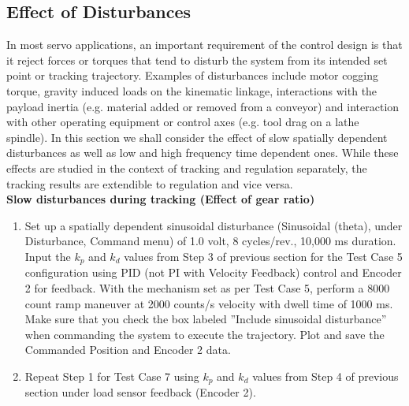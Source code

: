 \documentclass[11pt, a4paper]{article}
\begin{document}
\subsection{Effect of Disturbances}
In most servo applications, an important requirement of the control design is that it reject forces or torques that tend to disturb the system from its intended set point or tracking trajectory. Examples of disturbances include motor cogging torque, gravity induced loads on the kinematic linkage, interactions with the payload inertia (e.g. material added or removed from a conveyor) and interaction with other operating equipment or control axes (e.g. tool drag on a lathe spindle). In this section we shall consider the effect of slow spatially dependent disturbances as well as low and high frequency time dependent ones. While these effects are studied in the context of tracking and regulation separately, the tracking results are extendible to regulation and vice versa.\\
\textbf{Slow disturbances during tracking (Effect of gear ratio)}
\begin{enumerate}
\item Set up a spatially dependent sinusoidal disturbance (Sinusoidal (theta), under Disturbance, Command menu) of 1.0 volt, 8 cycles/rev., 10,000 ms duration. Input the $k_p$ and $k_d$ values from Step 3 of previous section for the Test Case 5 configuration using PID (not PI with Velocity Feedback) control and Encoder 2 for feedback. With the mechanism set as per Test Case 5, perform a 8000 count ramp maneuver at 2000 counts/s velocity with dwell time of 1000 ms. Make sure that you check the box labeled ”Include sinusoidal disturbance” when commanding the system to execute the trajectory. Plot and save the Commanded Position and Encoder 2 data.
\item Repeat Step 1 for Test Case 7 using $k_p$ and $k_d$ values from Step 4 of previous section under load sensor feedback (Encoder 2).
\end{enumerate}
\end{document}
